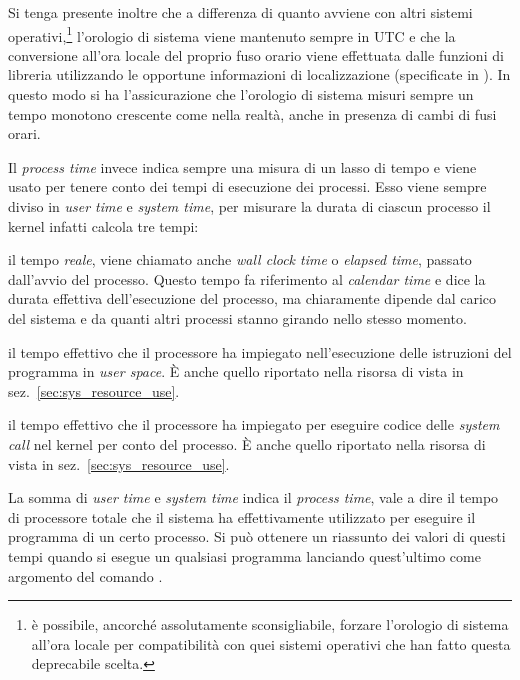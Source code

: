 Si tenga presente inoltre che a differenza di quanto avviene con altri sistemi
operativi,\footnote{è possibile, ancorché assolutamente sconsigliabile,
  forzare l'orologio di sistema all'ora locale per compatibilità con quei
  sistemi operativi che han fatto questa deprecabile scelta.}  l'orologio di
sistema viene mantenuto sempre in UTC e che la conversione all'ora locale del
proprio fuso orario viene effettuata dalle funzioni di libreria utilizzando le
opportune informazioni di localizzazione (specificate in
). In questo modo si ha l'assicurazione che l'orologio
di sistema misuri sempre un tempo monotono crescente come nella realtà, anche
in presenza di cambi di fusi orari.


Il \textit{process time} invece indica sempre una misura di un lasso di tempo
e viene usato per tenere conto dei tempi di esecuzione dei processi. Esso
viene sempre diviso in \textit{user time} e \textit{system time}, per misurare
la durata di ciascun processo il kernel infatti calcola tre tempi:
\begin{basedescript}{\desclabelwidth{2.2cm}\desclabelstyle{\nextlinelabel}}
\item[\textit{clock time}] il tempo \textsl{reale}, viene chiamato anche
  \textit{wall clock time} o \textit{elapsed time}, passato dall'avvio del
  processo. Questo tempo fa riferimento al 
  \textit{calendar time} e dice la durata effettiva dell'esecuzione del
  processo, ma chiaramente dipende dal carico del sistema e da quanti altri
  processi stanno girando nello stesso momento.
  
\item[\textit{user time}] il tempo effettivo che il processore ha impiegato
  nell'esecuzione delle istruzioni del programma in \textit{user space}. È
  anche quello riportato nella risorsa  di 
  vista in sez.~\ref{sec:sys_resource_use}.
  
\item[\textit{system time}] il tempo effettivo che il processore ha impiegato
  per eseguire codice delle \textit{system call} nel kernel per conto del
  processo.  È anche quello riportato nella risorsa  di
   vista in sez.~\ref{sec:sys_resource_use}.
\end{basedescript}

La somma di \textit{user time} e \textit{system time} indica il
\textit{process time}, vale a dire il tempo di processore totale che il
sistema ha effettivamente utilizzato per eseguire il programma di un certo
processo. Si può ottenere un riassunto dei valori di questi tempi quando si
esegue un qualsiasi programma lanciando quest'ultimo come argomento del
comando .


